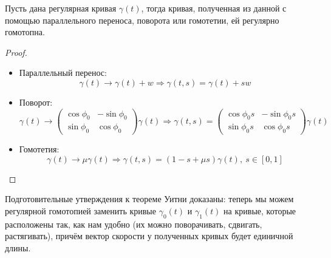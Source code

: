 

\begin{statement}
    Пусть дана регулярная кривая $\gamma(t)$, тогда кривая, полученная из данной с помощью параллельного переноса, поворота или гомотетии, ей регулярно гомотопна.
\end{statement} 
\begin{proof}\tab
    \begin{itemize}
        \item Параллельный перенос: 
        $$\gamma(t) \to \gamma(t) + w \Longrightarrow \gamma(t,s) = \gamma(t) + sw$$

        \item Поворот: 
        $$\gamma(t) \to \begin{pmatrix}
            \cos{\phi_0} & -\sin{\phi_0} \\
            \sin{\phi_0} & \cos{\phi_0}
        \end{pmatrix} \gamma(t)
        \Longrightarrow
        \gamma(t,s) = \begin{pmatrix}
            \cos{\phi_0 s} & -\sin{\phi_0 s} \\
            \sin{\phi_0 s} & \cos{\phi_0 s}
        \end{pmatrix} \gamma(t)$$

        \item Гомотетия: $$\gamma(t) \to \mu \gamma(t) \Longrightarrow \gamma(t,s) = (1 - s + \mu s) \gamma(t), \ s \in [0,1]$$
    \end{itemize}
\end{proof} 

Подготовительные утверждения к теореме Уитни доказаны: теперь мы можем регулярной гомотопией заменить кривые $\gamma_0(t)$ и $\gamma_1(t)$ на кривые, которые расположены так, как нам удобно (их можно поворачивать, сдвигать, растягивать), причём вектор скорости у полученных кривых будет единичной длины.

